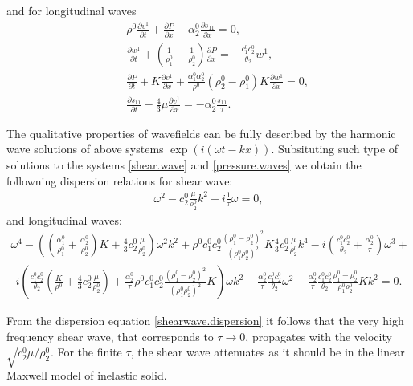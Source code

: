 \documentclass[3p,times]{elsarticle}
\begin{document}
and for longitudinal waves
\begin{eqnarray} \label{pressure.waves}
&&\rho^0\frac{\partial v^1}{\partial t}+\frac{\partial P}{\partial x}-
\alpha_2^0\frac{\partial s_{11}}{\partial x} = 0, \nonumber \\
&&\frac{\partial w^1}{\partial t}+\left( \frac{1}{\rho_1^0}-\frac{1}{\rho_2^0}\right)\frac{\partial P}{\partial x}=
-\frac{c_1^0c_2^0}{\theta_2}w^1,   \\
&&\frac{\partial P}{\partial t}+K\frac{\partial v^1}{\partial x}
+\frac{\alpha_1^0\alpha_2^0}{\rho^0}\left(\rho_2^0-\rho_1^0\right)K\frac{\partial w^1}{\partial x} = 0, \nonumber \\
&&\frac{\partial s_{11}}{\partial t} - 
\frac{4}{3}\mu\frac{\partial v^1}{\partial x} = - \alpha_2^0 \frac{s_{11}}{\tau}. \nonumber 
\end{eqnarray}

The qualitative properties of wavefields can be fully described by the harmonic wave solutions of above systems $\exp(i(\omega t- kx))$. Subsituting such type of solutions to the systems \eqref{shear.wave} and \eqref{pressure.waves} we obtain the followning dispersion relations for shear wave:
\begin{align}\label{shearwave.dispersion}
\omega^2-c_2^0\frac{\mu}{\rho_2^0}k^2 - i \frac{1}{\tau}\omega=0,
\end{align}
and longitudinal waves: 
\begin{align} %
\omega^4 - \left(\left(\frac{\alpha_1^0}{\rho_1^0}+\frac{\alpha_2^0}{\rho_2^0}\right)K+
\frac{4}{3}c^0_2\frac{\mu}{\rho_2^0} \right)\omega^2 k^2 +
\rho^0c^0_1c^0_2\frac{\left(\rho^0_1-\rho^0_2\right)^2}{(\rho^0_1\rho^0_2)^2}K
\frac{4}{3}c^0_2\frac{\mu}{\rho^0_2} k^4 - 
i\left(\frac{c^0_1c^0_2}{\theta_2}+\frac{\alpha^0_2}{\tau} \right) \omega^3 +  
\nonumber
\end{align}
\begin{align} \label{pressure.dispersion}
i\left(\frac{c^0_1c^0_2}{\theta_2}\left(\frac{K}{\rho^0}+\frac{4}{3}c^0_2\frac{\mu}{\rho^0_2}
\right) 
+\frac{\alpha^0_2}{\tau}\rho^0c^0_1c^0_2\frac{\left(\rho^0_1-\rho^0_2\right)^2}{(\rho^0_1\rho^0_2)^2}K\right) \omega k^2 -
\frac{\alpha^0_2}{\tau}\frac{c^0_1c^0_2}{\theta_2} \omega^2 -
\frac{\alpha^0_2}{\tau}\frac{c^0_1c^0_2}{\theta_2}\frac{\rho_1^0-\rho_2^0}{\rho_1^0\rho_2^0}K k^2
=0.
\end{align}

From the dispersion equation \eqref{shearwave.dispersion} it follows that the very high frequency shear wave, that corresponds to $\tau \rightarrow 0$,  propagates with the velocity 
$\sqrt{c_2^0 \mu/\rho_2^0}$. For the finite $\tau$, the shear wave attenuates as it should be in the linear Maxwell model of inelastic solid.
\end{document}
